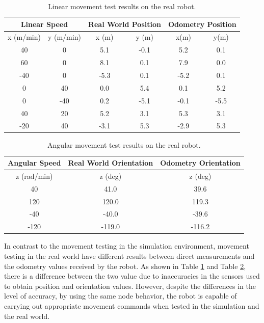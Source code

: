 \begin{table}
  \caption{Linear movement test results on the real robot.}
  \label{tab:realrobotlineartestresults}
  \centering
  \begin{tabular}{cc|cc|cc}
    \toprule
    \multicolumn{2}{c|}{Linear Speed} &
    \multicolumn{2}{|c|}{Real World Position} &
    \multicolumn{2}{|c}{Odometry Position} \\
    \midrule
    x (m/min) & y (m/min) & x (m) & y (m) & x(m)  & y(m) \\
    \midrule
    40        & 0         & 5.1   & -0.1  & 5.2   & 0.1 \\
    60        & 0         & 8.1   & 0.1   & 7.9   & 0.0 \\
    -40       & 0         & -5.3  & 0.1   & -5.2  & 0.1 \\
    0         & 40        & 0.0   & 5.4   & 0.1   & 5.2 \\
    0         & -40       & 0.2   & -5.1  & -0.1  & -5.5 \\
    40        & 20        & 5.2   & 3.1   & 5.3   & 3.1 \\
    -20       & 40        & -3.1  & 5.3   & -2.9  & 5.3 \\
    \bottomrule
  \end{tabular}
\end{table}

\begin{table}
  \caption{Angular movement test results on the real robot.}
  \label{tab:realrobotangulartestresults}
  \centering
  \begin{tabular}{c|c|c}
    \toprule
    Angular Speed   & Real World Orientation  & Odometry Orientation \\
    \midrule
    z (rad/min) & z (deg)                   & z (deg) \\
    \midrule
    40          & 41.0                      & 39.6 \\
    120         & 120.0                     & 119.3 \\
    -40         & -40.0                     & -39.6 \\
    -120        & -119.0                    & -116.2 \\
    \bottomrule
  \end{tabular}
\end{table}

In contrast to the movement testing in the simulation environment,
  movement testing in the real world have different results between direct measurements and the odometry values received by the robot.
As shown in Table \ref{tab:realrobotlineartestresults} and Table \ref{tab:realrobotangulartestresults},
  there is a difference between the two value due to inaccuracies in the sensors used to obtain position and orientation values.
However, despite the differences in the level of accuracy, by using the same node behavior,
  the robot is capable of carrying out appropriate movement commands when tested in the simulation and the real world.

